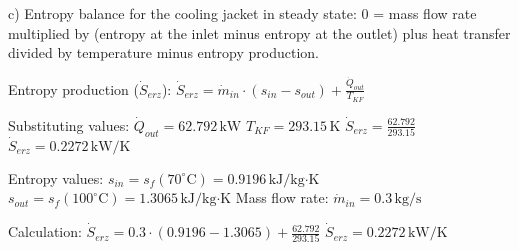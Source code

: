 c) Entropy balance for the cooling jacket in steady state:  
0 = mass flow rate multiplied by (entropy at the inlet minus entropy at the outlet) plus heat transfer divided by temperature minus entropy production.  

Entropy production (\( \dot{S}_{erz} \)):  
\( \dot{S}_{erz} = \dot{m}_{in} \cdot (s_{in} - s_{out}) + \frac{\dot{Q}_{out}}{T_{KF}} \)  

Substituting values:  
\( \dot{Q}_{out} = 62.792 \, \text{kW} \)  
\( T_{KF} = 293.15 \, \text{K} \)  
\( \dot{S}_{erz} = \frac{62.792}{293.15} \)  
\( \dot{S}_{erz} = 0.2272 \, \text{kW/K} \)  

Entropy values:  
\( s_{in} = s_f(70^\circ \text{C}) = 0.9196 \, \text{kJ/kg·K} \)  
\( s_{out} = s_f(100^\circ \text{C}) = 1.3065 \, \text{kJ/kg·K} \)  
Mass flow rate: \( \dot{m}_{in} = 0.3 \, \text{kg/s} \)  

Calculation:  
\( \dot{S}_{erz} = 0.3 \cdot (0.9196 - 1.3065) + \frac{62.792}{293.15} \)  
\( \dot{S}_{erz} = 0.2272 \, \text{kW/K} \)